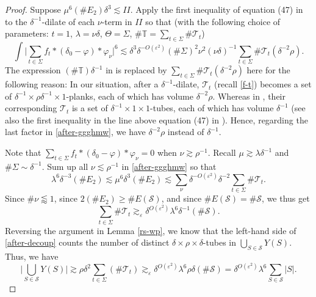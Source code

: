 \documentclass{amsart}%
\numberwithin{equation}{section}
\newcommand{\de}{\delta}
\newcommand{\e}{\varepsilon}
\newcommand{\la}{\lambda}
\newcommand{\Si}{\Sigma}
\newcommand{\vp}{\varphi}
\newcommand{\cs}{\mathcal S}
\newcommand{\ZT}{\mathbb{T}}
\newcommand{\cT}{{\mathcal T}}
\newcommand{\1}{\mathbbm{1}}
\begin{document}
\begin{proof}
Suppose $\mu^6(\#E_2)\de^3 \lesssim II$. 
Apply the first inequality of equation (47) in \cite{GGGHMW} to the $\de^{-1}$-dilate of each $\nu$-term in $II$ so that (with the following choice of parameters: $t=1$, $\la=\nu\de$, $\Theta=\Si$, $\#\ZT=\sum_{t\in\Si}\#\cT_t$)
\begin{equation}
\label{after-ggghmw}
     \int\Big|\sum_{t\in\Si} f_t\ast(\delta_0-\vp)\ast\vp_\nu\Big|^6\lesssim \de^3 \de^{-O(\e^2)}(\#\Si)^2\nu^2(\nu\de)^{-1}\sum_{t\in\Si}\#\cT_t(\de^{-2}\rho).
\end{equation}
The expression $(\#\ZT)\de^{-1}$ in \cite{GGGHMW} is replaced by $\sum_{t\in\Si}\#\cT_t(\de^{-2}\rho)$ here for the following reason: In our situation, after a $\de^{-1}$-dilate, $\cT_t$ (recall \eqref{f-t}) becomes a set of $\de^{-1}\times\rho\de^{-1}\times 1$-planks, each of which has volume $\de^{-2}\rho$.
Whereas in \cite{GGGHMW}, their corresponding $\cT_t$ is a set of $\de^{-1}\times1\times1$-tubes, each of which has volume $\de^{-1}$ (see also the first inequality in the line above equation (47) in \cite{GGGHMW}).
Hence, regarding the last factor in \eqref{after-ggghmw}, we have $\de^{-2}\rho$ instead of $\de^{-1}$.


Note that $\sum_{t\in\Si} f_t\ast(\delta_0-\vp)\ast\vp_\nu=0$ when $\nu\gtrsim\rho^{-1}$.
Recall $\mu\gtrsim\la\de^{-1}$ and $\#\Si\sim\de^{-1}$.
Sum up all $\nu\lesssim\rho^{-1}$ in \eqref{after-ggghmw} so that
\begin{equation}
    \la^6\de^{-3}(\# E_2)\lesssim\mu^6\de^3(\#E_2) \lesssim\sum_\nu\de^{-O(\e^2)}\de^{-2}\sum_{t\in\Si}\#\cT_t.
\end{equation}
Since $\# \nu\lessapprox1$, since $2(\#E_2)\geq\#E(\cs)$, and since $\#E(\cs)=\#\cs$, we thus get
\begin{equation}
\label{after-decoup}
    \sum_{t\in\Si}\#\cT_t\gtrsim_\e \de^{O(\e^2)}\la^6\de^{-1}(\#\cs).
\end{equation}
Reversing the argument in Lemma \ref{rs-wp}, we know that the left-hand side of \eqref{after-decoup} counts the number of distinct $\de\times\rho\times\de$-tubes in $\bigcup_{S\in\cs}Y(S)$. 
Thus, we have
\begin{equation}
\label{first-case}
    \Big|\bigcup_{S\in\cs}Y(S)\Big|\gtrsim \rho\de^2\sum_{t\in\Si}(\#\cT_t)\gtrsim_\e \de^{O(\e^2)}\la^{6}\rho\de(\#\cs)=\de^{O(\e^2)}\la^{6}\sum_{S\in\cs}|S|.
\end{equation}




\end{proof}
\end{document}
